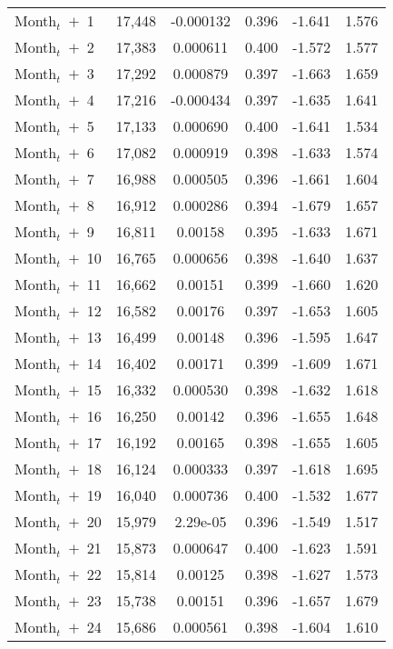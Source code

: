 \begin{table}[H]
\begin{center}
\begin{tabular}{lccccc}
 Month$_t$\ $+$\ 1 & 17,448 & -0.000132 & 0.396 & -1.641 & 1.576 \\
 Month$_t$\ $+$\ 2 & 17,383 & 0.000611 & 0.400 & -1.572 & 1.577 \\
 Month$_t$\ $+$\ 3 & 17,292 & 0.000879 & 0.397 & -1.663 & 1.659 \\
 Month$_t$\ $+$\ 4 & 17,216 & -0.000434 & 0.397 & -1.635 & 1.641 \\
 Month$_t$\ $+$\ 5& 17,133 & 0.000690 & 0.400 & -1.641 & 1.534 \\
 Month$_t$\ $+$\ 6& 17,082 & 0.000919 & 0.398 & -1.633 & 1.574 \\
 Month$_t$\ $+$\ 7 & 16,988 & 0.000505 & 0.396 & -1.661 & 1.604 \\
 Month$_t$\ $+$\ 8 & 16,912 & 0.000286 & 0.394 & -1.679 & 1.657 \\
 Month$_t$\ $+$\ 9 & 16,811 & 0.00158 & 0.395 & -1.633 & 1.671 \\
 Month$_t$\ $+$\ 10 & 16,765 & 0.000656 & 0.398 & -1.640 & 1.637 \\
 Month$_t$\ $+$\ 11 & 16,662 & 0.00151 & 0.399 & -1.660 & 1.620 \\
 Month$_t$\ $+$\ 12 & 16,582 & 0.00176 & 0.397 & -1.653 & 1.605 \\
 Month$_t$\ $+$\ 13 & 16,499 & 0.00148 & 0.396 & -1.595 & 1.647 \\
 Month$_t$\ $+$\ 14 & 16,402 & 0.00171 & 0.399 & -1.609 & 1.671 \\
 Month$_t$\ $+$\ 15 & 16,332 & 0.000530 & 0.398 & -1.632 & 1.618 \\
 Month$_t$\ $+$\ 16 & 16,250 & 0.00142 & 0.396 & -1.655 & 1.648 \\
 Month$_t$\ $+$\ 17 & 16,192 & 0.00165 & 0.398 & -1.655 & 1.605 \\
 Month$_t$\ $+$\ 18 & 16,124 & 0.000333 & 0.397 & -1.618 & 1.695 \\
 Month$_t$\ $+$\ 19 & 16,040 & 0.000736 & 0.400 & -1.532 & 1.677 \\
 Month$_t$\ $+$\ 20 & 15,979 & 2.29e-05 & 0.396 & -1.549 & 1.517 \\
 Month$_t$\ $+$\ 21 & 15,873 & 0.000647 & 0.400 & -1.623 & 1.591 \\
 Month$_t$\ $+$\ 22 & 15,814 & 0.00125 & 0.398 & -1.627 & 1.573 \\
 Month$_t$\ $+$\ 23 & 15,738 & 0.00151 & 0.396 & -1.657 & 1.679 \\
 Month$_t$\ $+$\ 24 & 15,686 & 0.000561 & 0.398 & -1.604 & 1.610 \\





\end{tabular}
\end{center}
\end{table}

